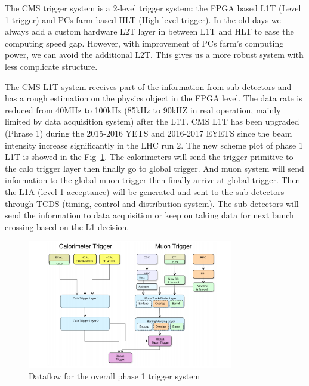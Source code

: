 The CMS trigger system is a 2-level trigger system: the FPGA based L1T (Level 1 trigger) and PCs farm based HLT (High level trigger). In the old days we always add a custom hardware L2T layer in between L1T and HLT to ease the computing speed gap. However, with improvement of PCs farm’s computing power, we can avoid the additional L2T. This gives us a more robust system with less complicate structure. 

The CMS L1T system receives part of the information from sub detectors and has a rough estimation on the physics object in the FPGA level. The data rate is reduced from 40MHz to 100kHz (85kHz to 90kHZ in real operation, mainly limited by data acquisition system) after the L1T. CMS L1T has been upgraded (Phrase 1) during the 2015-2016 YETS and 2016-2017 EYETS since the beam intensity increase significantly in the LHC run 2. The new scheme plot of phase 1 L1T is showed in the Fig~\ref{fig:c3cmsl1scheme}. The calorimeters will send the trigger primitive to the calo trigger layer then finally go to global trigger. And muon system will send information to the global muon trigger then finally arrive at global trigger. Then the L1A (level 1 acceptance) will be generated and sent to the sub detectors through TCDS (timing, control and distribution system). The sub detectors will send the information to data acquisition or keep on taking data for next bunch crossing based on the L1 decision. 

\begin{figure}[htbp]
 \begin{center}
  \includegraphics[width=0.8\textwidth]{figures/c3/c3_cms_l1scheme.png}
 \end{center}
 \caption{Dataflow for the overall phase 1 trigger system}
 \label{fig:c3cmsl1scheme}
\end{figure}

